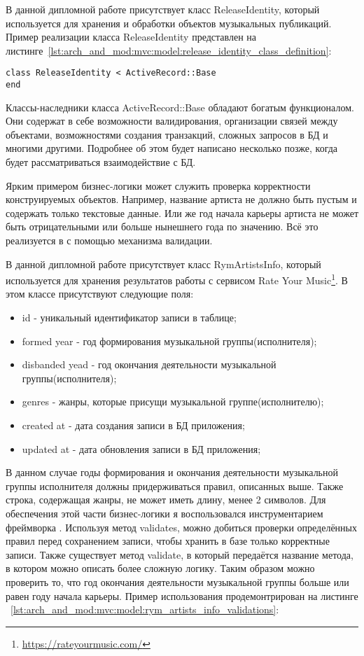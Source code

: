 В данной дипломной работе присутствует класс ReleaseIdentity, который используется для хранения и обработки объектов музыкальных публикаций. Пример реализации класса ReleaseIdentity представлен на листинге~\ref{lst:arch_and_mod:mvc:model:release_identity_class_definition}:
\begin{lstlisting}[style=fsharpstyle,caption={Базовая реализация класса ReleaseIdentity}, label=lst:arch_and_mod:mvc:model:release_identity_class_definition]
class ReleaseIdentity < ActiveRecord::Base
end
\end{lstlisting}

Классы-наследники класса ActiveRecord::Base обладают богатым функционалом. Они содержат в себе возможности валидирования, организации связей между объектами, возможностями создания транзакций, сложных запросов в БД и многими другими. Подробнее об этом будет написано несколько позже, когда будет рассматриваться взаимодействие с БД.

Ярким примером бизнес-логики может служить проверка корректности конструируемых объектов. Например, название артиста не должно быть пустым и содержать только текстовые данные. Или же год начала карьеры артиста не может быть отрицательными или больше нынешнего года по значению. Всё это реализуется в \ror{} с помощью механизма валидации.

В данной дипломной работе присутствует класс RymArtistsInfo, который используется для хранения результатов работы с сервисом Rate Your Music\footnote{\url{https://rateyourmusic.com/}}. В этом классе присутствуют следующие поля:

\begin{itemize}
  \item id - уникальный идентификатор записи в таблице;
  \item formed year - год формирования музыкальной группы(исполнителя);
  \item disbanded yead - год окончания деятельности музыкальной группы(исполнителя);
  \item genres - жанры, которые присущи музыкальной группе(исполнителю);
  \item created at - дата создания записи в БД приложения;
  \item updated at - дата обновления записи в БД приложения;
\end{itemize}

В данном случае годы формирования и окончания деятельности музыкальной группы исполнителя должны придерживаться правил, описанных выше. Также строка, содержащая жанры, не может иметь длину, менее 2 символов. Для обеспечения этой части бизнес-логики я воспользовался инструментарием фреймворка \ror{}. Используя метод validates, можно добиться проверки определённых правил перед сохранением записи, чтобы хранить в базе только корректные записи. Также существует метод validate, в который передаётся название метода, в котором можно описать более сложную логику. Таким образом можно проверить то, что год окончания деятельности музыкальной группы больше или равен году начала карьеры. Пример использования продемонтрирован на листинге ~\ref{lst:arch_and_mod:mvc:model:rym_artists_info_validations}:

